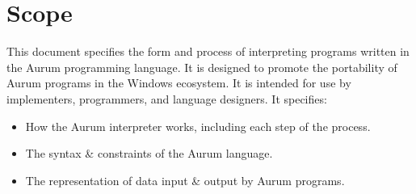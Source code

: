 \documentclass[12pt, letterpaper, oneside]{article}
\begin{document}
	\section{Scope}
	This document specifies the form and process of interpreting programs written in the Aurum programming language. It is designed to promote the portability of Aurum programs in the Windows ecosystem. It is intended for use by implementers, programmers, and language designers. It specifies:
	\begin{itemize}
		\item How the Aurum interpreter works, including each step of the process.
		\item The syntax \& constraints of the Aurum language.
		\item The representation of data input \& output by Aurum programs.
	\end{itemize}
\end{document}

